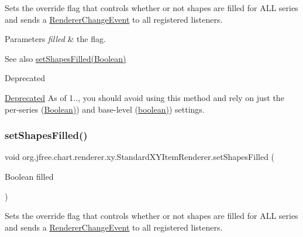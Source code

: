Sets the override flag that controls whether or not shapes are filled for A\+LL series and sends a \mbox{\hyperlink{}{Renderer\+Change\+Event}} to all registered listeners.


\begin{DoxyParams}{Parameters}
{\em filled} & the flag.\\
\hline
\end{DoxyParams}
\begin{DoxySeeAlso}{See also}
\mbox{\hyperlink{classorg_1_1jfree_1_1chart_1_1renderer_1_1xy_1_1_standard_x_y_item_renderer_a691d44954b5d647c31b17a13f4886b3b}{set\+Shapes\+Filled(\+Boolean)}}
\end{DoxySeeAlso}
\begin{DoxyRefDesc}{Deprecated}
\item[\mbox{\hyperlink{deprecated__deprecated000210}{Deprecated}}]As of 1.., you should avoid using this method and rely on just the per-\/series (\mbox{\hyperlink{}{Boolean)}}) and base-\/level (\mbox{\hyperlink{}{boolean)}}) settings. \end{DoxyRefDesc}
\mbox{\label{classorg_1_1jfree_1_1chart_1_1renderer_1_1xy_1_1_standard_x_y_item_renderer_a691d44954b5d647c31b17a13f4886b3b}} 
\subsubsection{\texorpdfstring{set\+Shapes\+Filled()}{setShapesFilled()}\hspace{0.1cm}{\footnotesize\ttfamily [2/2]}}
{\footnotesize\ttfamily void org.\+jfree.\+chart.\+renderer.\+xy.\+Standard\+X\+Y\+Item\+Renderer.\+set\+Shapes\+Filled (\begin{DoxyParamCaption}\item[{Boolean}]{filled }\end{DoxyParamCaption})}

Sets the override flag that controls whether or not shapes are filled for A\+LL series and sends a \mbox{\hyperlink{}{Renderer\+Change\+Event}} to all registered listeners.


